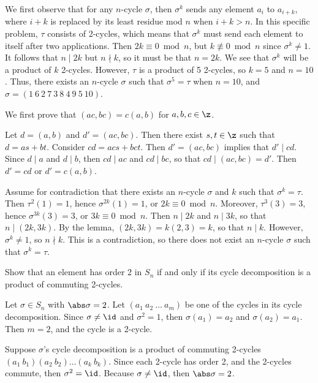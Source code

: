 \begin{solalph}
    \item We first observe that for any $n$-cycle $\sigma$, then $\sigma^k$ sends any element $a_i$ to $a_{i + k}$, where $i + k$ is replaced by its least residue mod $n$ when $i + k > n$. In this specific problem, $\tau$ consists of 2-cycles, which means that $\sigma^k$ must send each element to itself after two applications. Then $2k \equiv 0 \bmod n$, but $k \not\equiv 0 \bmod n$ since $\sigma^k \neq 1$. It follows that $n \mid 2k$ but $n \nmid k$, so it must be that $n = 2k$. We see that $\sigma^k$ will be a product of $k$ 2-cycles. However, $\tau$ is a product of 5 2-cycles, so $k = 5$ and $n = 10$. Thus, there exists an $n$-cycle $\sigma$ such that $\sigma^5 = \tau$ when $n = 10$, and $\sigma = (1\ 6\ 2\ 7\ 3\ 8\ 4\ 9\ 5\ 10)$.
    \item We first prove that $(ac, bc) = c(a, b)$ for $a, b, c \in \z$.
    \begin{lemma}
        Let $d = (a, b)$ and $d' = (ac, bc)$. Then there exist $s, t \in \z$ such that $d = as + bt$. Consider $cd = acs + bct$. Then $d' = (ac, bc)$ implies that $d' \mid cd$. Since $d \mid a$ and $d \mid b$, then $cd \mid ac$ and $cd \mid bc$, so that $cd \mid (ac, bc) = d'$. Then $d' = cd$ or $d' = c(a, b)$.
    \end{lemma}
    
    Assume for contradiction that there exists an $n$-cycle $\sigma$ and $k$ such that $\sigma^k = \tau$. Then $\tau^2(1) = 1$, hence $\sigma^{2k}(1) = 1$, or $2k \equiv 0 \bmod n$. Moreover, $\tau^3(3) = 3$, hence $\sigma^{3k}(3) = 3$, or $3k \equiv 0 \bmod n$. Then $n \mid 2k$ and $n \mid 3k$, so that $n \mid (2k, 3k)$. By the lemma, $(2k, 3k) = k(2, 3) = k$, so that $n \mid k$. However, $\sigma^k \neq 1$, so $n \nmid k$. This is a contradiction, so there does not exist an $n$-cycle $\sigma$ such that $\sigma^k = \tau$.
\end{solalph}

\begin{exercise}\label{ex1.3.13}
    Show that an element has order 2 in $S_n$ if and only if its cycle decomposition is a product of commuting 2-cycles.
\end{exercise}

\begin{solitem}
    \item [\rightimp] Let $\sigma \in S_n$ with $\abs\sigma = 2$. Let $(a_1\ a_2\ \ldots\ a_m)$ be one of the cycles in its cycle decomposition. Since $\sigma \neq \id$ and $\sigma^2 = 1$, then $\sigma(a_1) = a_2$ and $\sigma(a_2) = a_1$. Then $m = 2$, and the cycle is a 2-cycle.
    \item [\leftimp] Suppose $\sigma$'s cycle decomposition is a product of commuting 2-cycles $(a_1\ b_1)(a_2\ b_2) \ldots (a_k\ b_k)$. Since each 2-cycle has order 2, and the 2-cycles commute, then $\sigma^2 = \id$. Because $\sigma \neq \id$, then $\abs\sigma = 2$.
\end{solitem}

